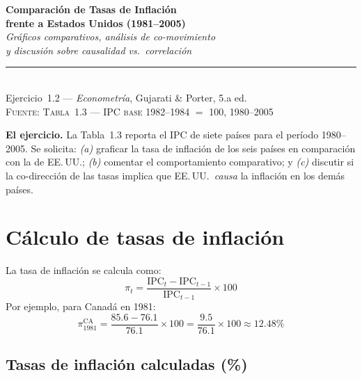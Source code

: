 \documentclass[12pt, letterpaper]{article}
\theoremstyle{remark}
\begin{document}
\begin{center}
  {\LARGE\bfseries Comparaci\'on de Tasas de Inflaci\'on}\\[6pt]
  {\LARGE\bfseries frente a Estados Unidos (1981--2005)}\\[12pt]
  {\large\itshape Gr\'aficos comparativos, an\'alisis de co-movimiento}\\
  {\large\itshape y discusi\'on sobre causalidad vs.\ correlaci\'on}\\[14pt]
  \rule{0.55\linewidth}{0.6pt}\\[8pt]
  {\normalsize Ejercicio~1.2 --- \textit{Econometr\'ia}, Gujarati \& Porter, 5.a ed.}\\[4pt]
  {\small\textsc{Fuente: Tabla~1.3 --- IPC base 1982--1984 $=$ 100, 1980--2005}}
\end{center}

\vspace{10pt}

\noindent\textbf{El ejercicio.}\quad
La Tabla~1.3 reporta el IPC de siete pa\'ises para el per\'iodo 1980--2005.
Se solicita: \emph{(a)} graficar la tasa de inflaci\'on de los seis pa\'ises
en comparaci\'on con la de EE.\,UU.; \emph{(b)} comentar el comportamiento
comparativo; y \emph{(c)} discutir si la co-direcci\'on de las tasas implica
que EE.\,UU.\ \emph{causa} la inflaci\'on en los dem\'as pa\'ises.

\section{C\'alculo de tasas de inflaci\'on}

La tasa de inflaci\'on se calcula como:
\begin{equation}
  \pi_t = \frac{\text{IPC}_t - \text{IPC}_{t-1}}{\text{IPC}_{t-1}} \times 100
  \label{eq:pi}
\end{equation}
Por ejemplo, para Canad\'a en 1981:
\begin{equation}
  \pi_{1981}^{\text{CA}} = \frac{85.6 - 76.1}{76.1}\times 100
  = \frac{9.5}{76.1}\times 100 \approx 12.48\%
  \label{eq:ejemplo}
\end{equation}

\subsection{Tasas de inflaci\'on calculadas (\%)}
\end{document}
